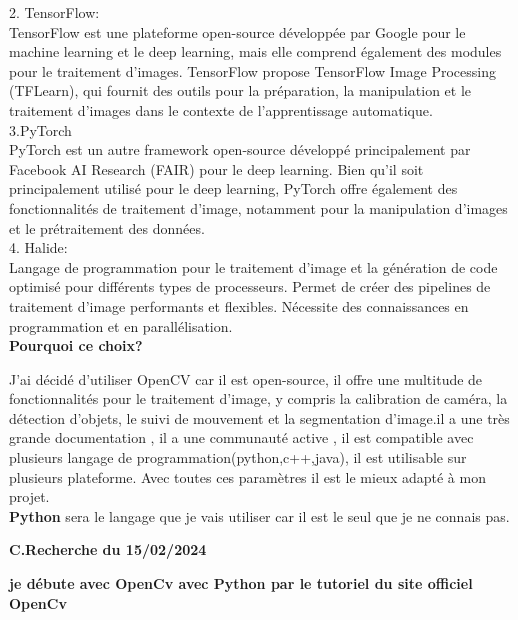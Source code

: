 \documentclass[12pt,a4paper]{article}
\begin{document}
2. TensorFlow:\\

TensorFlow est une plateforme open-source développée par Google pour le machine learning et le deep learning, mais elle comprend également des modules pour le traitement d'images.
TensorFlow propose TensorFlow Image Processing (TFLearn), qui fournit des outils pour la préparation, la manipulation et le traitement d'images dans le contexte de l'apprentissage automatique.\\

3.PyTorch\\

PyTorch est un autre framework open-source développé principalement par Facebook AI Research (FAIR) pour le deep learning.
Bien qu'il soit principalement utilisé pour le deep learning, PyTorch offre également des fonctionnalités de traitement d'image, notamment pour la manipulation d'images et le prétraitement des données.\\

4. Halide:\\

Langage de programmation pour le traitement d'image et la génération de code optimisé pour différents types de processeurs.
Permet de créer des pipelines de traitement d'image performants et flexibles.
Nécessite des connaissances en programmation et en parallélisation.\\

\textbf{Pourquoi ce choix?\\}

J'ai décidé d'utiliser OpenCV car il est open-source, il offre une multitude de fonctionnalités pour le traitement d'image, y compris la calibration de caméra, la détection d'objets, le suivi de mouvement et la segmentation d'image.il a une très grande documentation , il a une communauté active , il est compatible avec plusieurs langage de programmation(python,c++,java), il est utilisable sur plusieurs plateforme.
Avec toutes ces paramètres il est le mieux adapté à mon projet.\\

\textbf{Python} sera le langage que je vais utiliser car  il est le seul que je ne connais pas.\\

\begin{center}
	\textbf{C.Recherche du 15/02/2024\\}
\end{center}


\textbf{je débute avec OpenCv avec Python par le tutoriel du site officiel OpenCv \cite{noauthor_opencv_2020}}
\end{document}
